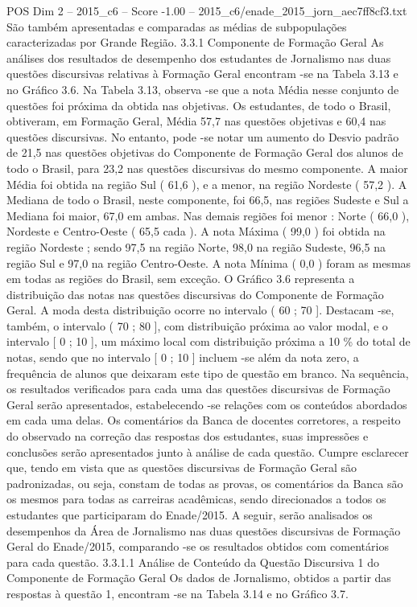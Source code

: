 \begin{textsample}{POS Dim 2 – 2015\_c6 – Score -1.00 – 2015\_c6/enade\_2015\_jorn\_aec7ff8cf3.txt}
São também apresentadas e comparadas as médias de subpopulações caracterizadas por Grande Região. 3.3.1 Componente de Formação Geral As análises dos resultados de desempenho dos estudantes de Jornalismo nas duas questões discursivas relativas à Formação Geral encontram -se na Tabela 3.13 e no Gráfico 3.6.
Na Tabela 3.13, observa -se que a nota Média nesse conjunto de questões foi próxima da obtida nas objetivas.
Os estudantes, de todo o Brasil, obtiveram, em Formação Geral, Média 57,7 nas questões objetivas e 60,4 nas questões discursivas.
No entanto, pode -se notar um aumento do Desvio padrão de 21,5 nas questões objetivas do Componente de Formação Geral dos alunos de todo o Brasil, para 23,2 nas questões discursivas do mesmo componente.
A maior Média foi obtida na região Sul ( 61,6 ), e a menor, na região Nordeste ( 57,2 ).
A Mediana de todo o Brasil, neste componente, foi 66,5, nas regiões Sudeste e Sul a Mediana foi maior, 67,0 em ambas.
Nas demais regiões foi menor : Norte ( 66,0 ), Nordeste e Centro-Oeste ( 65,5 cada ).
A nota Máxima ( 99,0 ) foi obtida na região Nordeste ; sendo 97,5 na região Norte, 98,0 na região Sudeste, 96,5 na região Sul e 97,0 na região Centro-Oeste.
A nota Mínima ( 0,0 ) foram as mesmas em todas as regiões do Brasil, sem exceção.
O Gráfico 3.6 representa a distribuição das notas nas questões discursivas do Componente de Formação Geral.
A moda desta distribuição ocorre no intervalo ( 60 ; 70 ].
Destacam -se, também, o intervalo ( 70 ; 80 ], com distribuição próxima ao valor modal, e o intervalo [ 0 ; 10 ], um máximo local com distribuição próxima a 10 \% do total de notas, sendo que no intervalo [ 0 ; 10 ] incluem -se além da nota zero, a frequência de alunos que deixaram este tipo de questão em branco.
Na sequência, os resultados verificados para cada uma das questões discursivas de Formação Geral serão apresentados, estabelecendo -se relações com os conteúdos abordados em cada uma delas.
Os comentários da Banca de docentes corretores, a respeito do observado na correção das respostas dos estudantes, suas impressões e conclusões serão apresentados junto à análise de cada questão.
Cumpre esclarecer que, tendo em vista que as questões discursivas de Formação Geral são padronizadas, ou seja, constam de todas as provas, os comentários da Banca são os mesmos para todas as carreiras acadêmicas, sendo direcionados a todos os estudantes que participaram do Enade/2015.
A seguir, serão analisados os desempenhos da Área de Jornalismo nas duas questões discursivas de Formação Geral do Enade/2015, comparando -se os resultados obtidos com comentários para cada questão. 3.3.1.1 Análise de Conteúdo da Questão Discursiva 1 do Componente de Formação Geral Os dados de Jornalismo, obtidos a partir das respostas à questão 1, encontram -se na Tabela 3.14 e no Gráfico 3.7.

\end{textsample}
